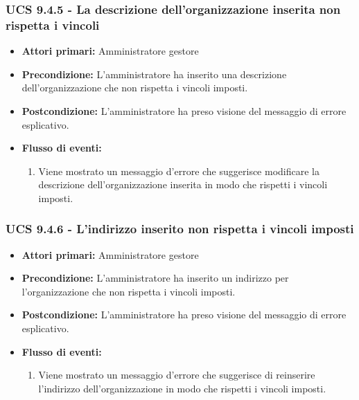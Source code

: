 \subsubsection{UCS 9.4.5 - La descrizione dell'organizzazione inserita non rispetta i vincoli}%
\begin{itemize}
\item \textbf{Attori primari:} Amministratore gestore
\item \textbf{Precondizione:} L'amministratore ha inserito una descrizione dell'organizzazione che non rispetta i vincoli imposti.
\item \textbf{Postcondizione:} L'amministratore ha preso visione del messaggio di errore esplicativo.
\item \textbf{Flusso di eventi:}
    \begin{enumerate}
    \item Viene mostrato un messaggio d'errore che suggerisce modificare la descrizione dell'organizzazione inserita in modo che rispetti i vincoli imposti.
    \end{enumerate} 
\end{itemize}

\subsubsection{UCS 9.4.6 - L'indirizzo inserito non rispetta i vincoli imposti}%
\begin{itemize}
\item \textbf{Attori primari:} Amministratore gestore
\item \textbf{Precondizione:} L'amministratore ha inserito un indirizzo per l'organizzazione che non rispetta i vincoli imposti.
\item \textbf{Postcondizione:} L'amministratore ha preso visione del messaggio di errore esplicativo.
\item \textbf{Flusso di eventi:}
    \begin{enumerate}
    \item Viene mostrato un messaggio d'errore che suggerisce di reinserire l'indirizzo dell'organizzazione in modo che rispetti i vincoli imposti.
    \end{enumerate} 
\end{itemize}

